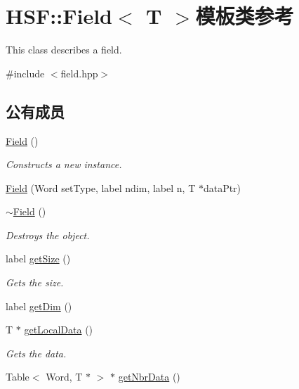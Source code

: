 \hypertarget{classHSF_1_1Field}{
\section{HSF::Field$<$ T $>$模板类参考}
\label{classHSF_1_1Field}
}


This class describes a field.  


{\ttfamily \#include $<$field.hpp$>$}\subsection*{公有成员}
\begin{DoxyCompactItemize}
\item 
\hyperlink{classHSF_1_1Field_a67ca23ee998b8ec6ff61de5f714db4d6}{Field} ()
\begin{DoxyCompactList}\small\item\em Constructs a new instance. \item\end{DoxyCompactList}\item 
\hyperlink{classHSF_1_1Field_af76ece196c8cc0120f8d2eaa2eb2da16}{Field} (Word setType, label ndim, label n, T $\ast$dataPtr)
\item 
\hyperlink{classHSF_1_1Field_a7a1de4fe37f4483401a62dd7b410c577}{$\sim$Field} ()
\begin{DoxyCompactList}\small\item\em Destroys the object. \item\end{DoxyCompactList}\item 
label \hyperlink{classHSF_1_1Field_aad566df51a130e83b42ae93ea2958eb1}{getSize} ()
\begin{DoxyCompactList}\small\item\em Gets the size. \item\end{DoxyCompactList}\item 
label \hyperlink{classHSF_1_1Field_a2e8e21702b089d3ab3d41fa24353f31d}{getDim} ()
\item 
T $\ast$ \hyperlink{classHSF_1_1Field_a737e777234950a28e98c42aebbdc8f32}{getLocalData} ()
\begin{DoxyCompactList}\small\item\em Gets the data. \item\end{DoxyCompactList}\item 
Table$<$ Word, T $\ast$ $>$ $\ast$ \hyperlink{classHSF_1_1Field_a5e2ff61fdd0a7b51b59d35564101e394}{getNbrData} ()

\end{DoxyCompactItemize}
